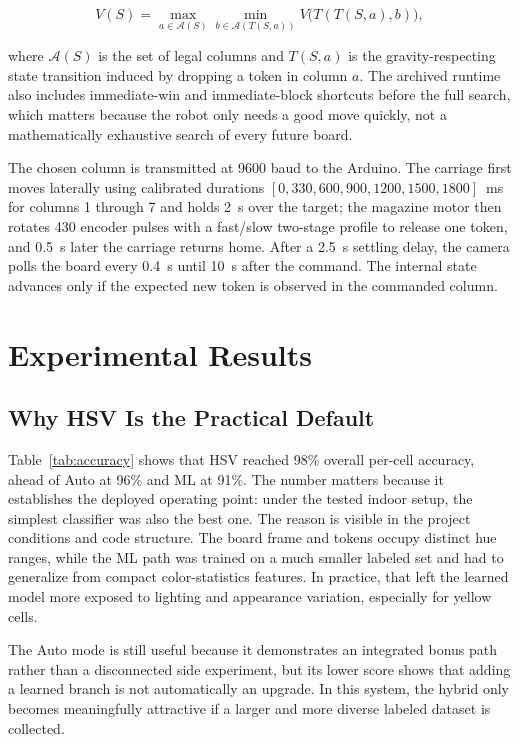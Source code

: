 \documentclass[conference]{IEEEtran}
\begin{document}
\begin{equation}
V(S)=\max_{a \in \mathcal{A}(S)} \min_{b \in \mathcal{A}(T(S,a))} V\bigl(T(T(S,a),b)\bigr),
\label{eq:minimax}
\end{equation}

where $\mathcal{A}(S)$ is the set of legal columns and $T(S,a)$ is the gravity-respecting state transition induced by dropping a token in column $a$. The archived runtime also includes immediate-win and immediate-block shortcuts before the full search, which matters because the robot only needs a good move quickly, not a mathematically exhaustive search of every future board.

The chosen column is transmitted at 9600 baud to the Arduino. The carriage first moves laterally using calibrated durations $[0, 330, 600, 900, 1200, 1500, 1800]$~ms for columns 1 through 7 and holds 2~s over the target; the magazine motor then rotates 430 encoder pulses with a fast/slow two-stage profile to release one token, and 0.5~s later the carriage returns home. After a 2.5~s settling delay, the camera polls the board every 0.4~s until 10~s after the command. The internal state advances only if the expected new token is observed in the commanded column.

\section{Experimental Results}
\subsection{Why HSV Is the Practical Default}
Table~\ref{tab:accuracy} shows that HSV reached 98\% overall per-cell accuracy, ahead of Auto at 96\% and ML at 91\%. The number matters because it establishes the deployed operating point: under the tested indoor setup, the simplest classifier was also the best one. The reason is visible in the project conditions and code structure. The board frame and tokens occupy distinct hue ranges, while the ML path was trained on a much smaller labeled set and had to generalize from compact color-statistics features. In practice, that left the learned model more exposed to lighting and appearance variation, especially for yellow cells.

The Auto mode is still useful because it demonstrates an integrated bonus path rather than a disconnected side experiment, but its lower score shows that adding a learned branch is not automatically an upgrade. In this system, the hybrid only becomes meaningfully attractive if a larger and more diverse labeled dataset is collected.
\end{document}
